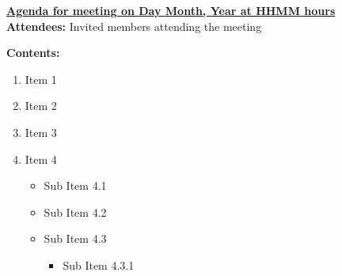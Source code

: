 \documentclass{letter}
\begin{document}
{\large \textbf{\underline{Agenda for meeting on Day Month, Year at HHMM hours}}}\\

\textbf{Attendees:} Invited members attending the meeting

\textbf{Contents:}

\begin{enumerate}
\item Item 1
\item Item 2
\item Item 3
\item Item 4
	\begin{itemize}
	\item Sub Item 4.1
	\item Sub Item 4.2
	\item Sub Item 4.3 
		\begin{itemize}
		\item Sub Item 4.3.1
		\end{itemize}
	\end{itemize}
\end{enumerate}
 
\end{document}
